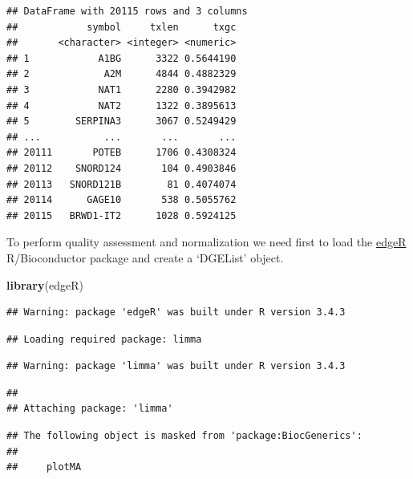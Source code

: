 \documentclass[]{article}
\newenvironment{Shaded}{\begin{snugshade}}{\end{snugshade}}
\newcommand{\KeywordTok}[1]{\textcolor[rgb]{0.13,0.29,0.53}{\textbf{{#1}}}}
\newcommand{\DataTypeTok}[1]{\textcolor[rgb]{0.13,0.29,0.53}{{#1}}}
\newcommand{\StringTok}[1]{\textcolor[rgb]{0.31,0.60,0.02}{{#1}}}
\newcommand{\NormalTok}[1]{{#1}}
\begin{document}
\begin{verbatim}
## DataFrame with 20115 rows and 3 columns
##            symbol     txlen      txgc
##       <character> <integer> <numeric>
## 1            A1BG      3322 0.5644190
## 2             A2M      4844 0.4882329
## 3            NAT1      2280 0.3942982
## 4            NAT2      1322 0.3895613
## 5        SERPINA3      3067 0.5249429
## ...           ...       ...       ...
## 20111       POTEB      1706 0.4308324
## 20112    SNORD124       104 0.4903846
## 20113   SNORD121B        81 0.4074074
## 20114      GAGE10       538 0.5055762
## 20115   BRWD1-IT2      1028 0.5924125
\end{verbatim}

To perform quality assessment and normalization we need first to load
the \href{http://bioconductor.org/packages/edgeR}{edgeR} R/Bioconductor
package and create a `DGEList' object.

\begin{Shaded}
\begin{Highlighting}[]
\KeywordTok{library}\NormalTok{(edgeR)}
\end{Highlighting}
\end{Shaded}

\begin{verbatim}
## Warning: package 'edgeR' was built under R version 3.4.3
\end{verbatim}

\begin{verbatim}
## Loading required package: limma
\end{verbatim}

\begin{verbatim}
## Warning: package 'limma' was built under R version 3.4.3
\end{verbatim}

\begin{verbatim}
## 
## Attaching package: 'limma'
\end{verbatim}

\begin{verbatim}
## The following object is masked from 'package:BiocGenerics':
## 
##     plotMA
\end{verbatim}

\begin{Shaded}
\end{Shaded}
\end{document}
